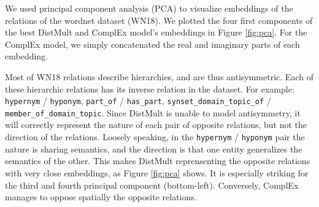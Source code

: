 \documentclass{article}
\begin{document}
We used principal component analysis (PCA) to visualize embeddings of the relations 
of the wordnet dataset (WN18). We plotted the four first components of the best DistMult
and ComplEx model's embeddings in Figure \ref{fig:pca}. For the ComplEx model, we simply concatenated
the real and imaginary parts of each embedding. 

Most of WN18 relations describe hierarchies, and are thus antisymmetric.
Each of these hierarchic relations has its inverse relation in the dataset. For example: \texttt{hypernym} / \texttt{hyponym},
\texttt{part\_of} / \texttt{has\_part}, \texttt{synset\_domain\_topic\_of} / \texttt{member\_of\_domain\_topic}.
Since DistMult is unable to model antisymmetry, it will correctly represent the nature
of each pair of opposite relations, but not the direction of the relations.
Loosely speaking, in the \texttt{hypernym} / \texttt{hyponym} pair the nature is 
sharing semantics,
and the direction is that one entity generalizes the semantics of the other. 
This makes DistMult reprensenting the opposite relations with very close embeddings,
as Figure \ref{fig:pca} shows. It is especially striking for the third and
fourth principal component (bottom-left). Conversely, ComplEx manages to oppose spatially
the opposite relations.
\end{document}
